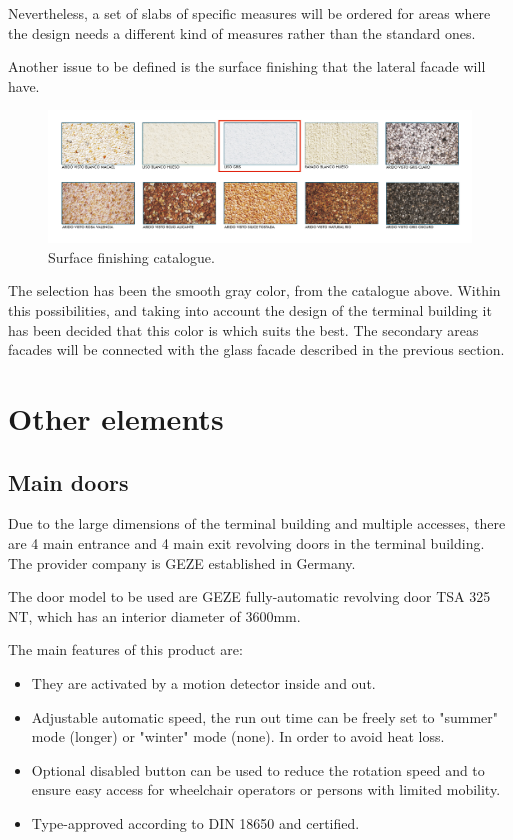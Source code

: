 Nevertheless, a set of slabs of specific measures will be ordered for areas where the design needs a different kind of measures rather than the standard ones. 

Another issue to be defined is the surface finishing that the lateral facade will have.

	\begin{figure}[ht!]
	\centering
\includegraphics[width=13cm]{./images/Facade/finishing}
\caption{Surface finishing catalogue.}
\end{figure}

The selection has been the smooth gray color, from the catalogue above. Within this possibilities, and taking into account the design of the terminal building it has been decided that this color is which suits the best. The secondary areas facades will be connected with the glass facade described in the previous section.




	\section{Other elements}
		\subsection{Main doors}
	Due to the large dimensions of the terminal building and multiple accesses, there are 4 main entrance and 4 main exit revolving doors in the terminal building. The provider company is GEZE established in Germany.
	
	The door model to be used are GEZE fully-automatic revolving door TSA 325 NT, which has an interior diameter of 3600mm.
	
	The main features of this product are:
	\begin{itemize}
	\item They are activated by a motion detector inside and out.
	\item Adjustable automatic speed, the run out time can be freely set to "summer" mode (longer) or "winter" mode (none). In order to avoid heat loss.
	\item Optional disabled button can be used to reduce the rotation speed and to ensure easy access for wheelchair operators or persons with limited mobility.	
	\item Type-approved according to DIN 18650 and certified.
	\end{itemize}
	
